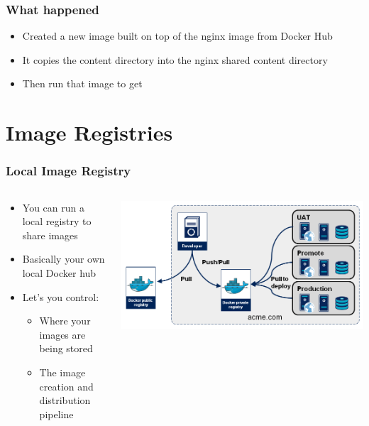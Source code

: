 \documentclass[aspectratio=169,11pt,hyperref={colorlinks=true}]{beamer}
\begin{document}
\begin{frame}
    \frametitle{What happened}
    \begin{itemize}
        \item Created a new image built on top of the nginx image from Docker Hub
        \item It copies the content directory into the nginx shared content directory
        \item Then run that image to get
    \end{itemize}

\end{frame}


\section{Image Registries}
\begin{frame}
    \frametitle{Local Image Registry}
    \begin{columns}[T]
        \begin{column}{.48\textwidth}
            \begin{itemize}
                \item You can run a local registry to share images
                \item Basically your own local Docker hub
                \item Let's you control:
                    \begin{itemize}
                        \item Where your images are being stored
                        \item The image creation and distribution pipeline
                    \end{itemize}
            \end{itemize}
        \end{column}
        \begin{column}{.48\textwidth}
            \centering
            \includegraphics[width=\textwidth]{registry.png}
        \end{column}
    \end{columns}
\end{frame}
\end{document}

